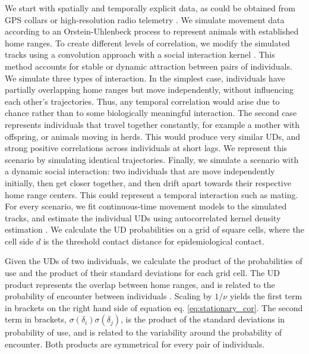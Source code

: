 \documentclass[letterpaper]{article}
\begin{document}
We start with spatially and temporally explicit data, as could be obtained from GPS collars or high-resolution radio telemetry \citep{Aspillaga2021}. We simulate movement data according to an Orstein-Uhlenbeck process to represent animals with established home ranges. To create different levels of correlation, we modify the simulated tracks using a convolution approach with a social interaction kernel \citep{Scharf2018}. This method accounts for stable or dynamic attraction between pairs of individuals. We simulate three types of interaction. 
In the simplest case, individuals have partially overlapping home ranges but move independently, without influencing each other's trajectories. %
Thus, any temporal correlation would arise due to chance rather than to some biologically meaningful interaction. 
The second case represents individuals that travel together constantly, for example a mother with offspring, or animals moving in herds. This would produce very similar UDs, and strong positive correlations across individuals at short lags. We represent this scenario by simulating identical trajectories.
Finally, we simulate a scenario with a dynamic social interaction: two individuals that are move independently initially, then get closer together, and then drift apart towards their respective home range centers. This could represent a temporal interaction such as mating.
For every scenario, we fit continuous-time movement models to the simulated tracks, and estimate the individual UDs using autocorrelated kernel density estimation \citep{Calabrese2016}. We calculate the UD probabilities on a grid of square cells, where the cell side $d$ is the threshold contact distance for epidemiological contact. 

Given the UDs of two individuals, we calculate the product of the probabilities of use and the product of their standard deviations for each grid cell.  The UD product represents the overlap between home ranges, and is related to the probability of encounter between individuals \citep{Noonan2021}. Scaling by $1/\nu$ yields the first term in brackets on the right hand side of equation eq. \ref{eq:stationary_cor}. %
The second term in brackets, $\sigma(\delta_i)\sigma(\delta_j)$, is the product of the standard deviations in probability of use, and is related to the variability around the probability of encounter. 
Both products are symmetrical for every pair of individuals. 
\end{document}
